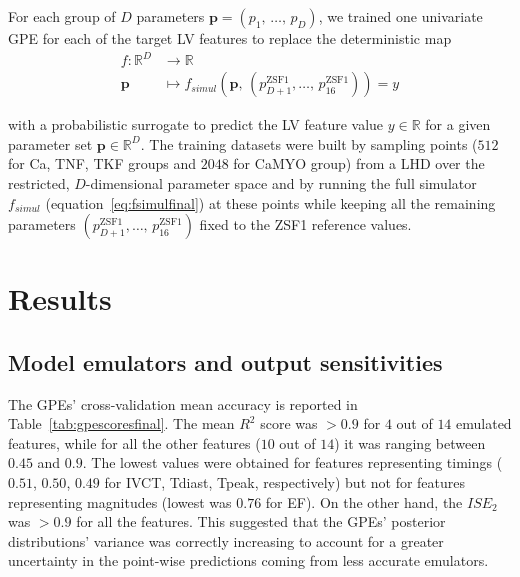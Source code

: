 \vspace{0.2cm}
For each group of $D$ parameters $\mathbf{p}=(p_1,\,\dots,\,p_D)$, we trained one univariate GPE for each of the target LV features to replace the deterministic map
%
\begin{align}
    f\colon\mathbb{R}^D &\to \mathbb{R} \\
    \mathbf{p} &\mapsto f_{simul}(\mathbf{p},\,(p_{D+1}^{\textrm{ZSF1}},\dots,\,p_{16}^{\textrm{ZSF1}}))=y
\end{align}

\vspace{0.2cm}\noindent
with a probabilistic surrogate to predict the LV feature value $y\in\mathbb{R}$ for a given parameter set $\mathbf{p}\in\mathbb{R}^D$. The training datasets were built by sampling points ($512$ for Ca, TNF, TKF groups and $2048$ for CaMYO group) from a LHD over the restricted, $D$-dimensional parameter space and by running the full simulator $f_{simul}$ (equation~\eqref{eq:fsimulfinal}) at these points while keeping all the remaining parameters $(p_{D+1}^{\textrm{ZSF1}},\dots,\,p_{16}^{\textrm{ZSF1}})$ fixed to the ZSF1 reference values. 


%
%
%
\section{Results}\label{sec:ch7results}

%
%
%
\subsection{Model emulators and output sensitivities}\label{sec:ch7modelemulatorsandoutputsensitivities}
The GPEs' cross-validation mean accuracy is reported in Table~\ref{tab:gpescoresfinal}. The mean $R^2$ score was $>0.9$ for $4$ out of $14$ emulated features, while for all the other features ($10$ out of $14$) it was ranging between $0.45$ and $0.9$. The lowest values were obtained for features representing timings ($0.51$, $0.50$, $0.49$ for IVCT, Tdiast, Tpeak, respectively) but not for features representing magnitudes (lowest was $0.76$ for EF). On the other hand, the $ISE_{2}$ was $>0.9$ for all the features. This suggested that the GPEs' posterior distributions' variance was correctly increasing to account for a greater uncertainty in the point-wise predictions coming from less accurate emulators.

